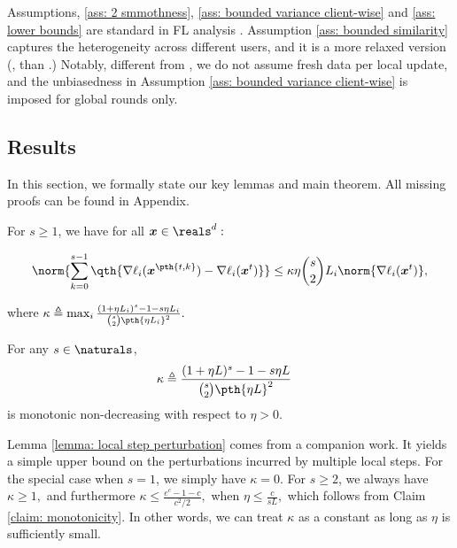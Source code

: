 \documentclass[letterpaper, 10 pt, conference]{ieeeconf}  %
\newcommand{\x}{{\bm x}}
\begin{document}
Assumptions, \ref{ass: 2 smmothness},  \ref{ass: bounded variance client-wise} and \ref{ass: lower bounds} are standard in FL analysis \cite{karimireddy2020scaffold,li2020federated,yuan2022}.
Assumption \ref{ass: bounded similarity} captures the heterogeneity across different users, and it is a more relaxed version (\eg, than \cite{li2020federated,yu2019parallel,wang2021cooperative}.)
Notably, different from \cite{gu2021fast}, we do not assume fresh data per local update, and the unbiasedness in Assumption \ref{ass: bounded variance client-wise} is imposed for global rounds only. 

\subsection{Results}
In this section, we formally state our key lemmas and main theorem. 
All missing proofs can be found in Appendix.
\begin{lemma}
\label{lemma: local step perturbation}
For $s\ge 1$, we have for all $\x\in\reals^d:$

\begin{small}
\[
\norm{\sum_{k=0}^{s-1}\qth{ \nabla \ell_i (\x^{\pth{t,k}}) - \nabla \ell_i (\x^t)}}
\le \kappa \eta \binom{s}{2} L_i \norm{\nabla \ell_{i}(\x^t)},
\]
\end{small}

where
$
\kappa \triangleq \max_{i}\frac{(1+\eta L_i)^s - 1- s \eta L_i}{\binom{s}{2}\pth{\eta L_i}^2}.
$
\end{lemma}
\begin{claim}
\label{claim: monotonicity}
For any $s\in \naturals$, 
    \begin{align*}
        \kappa &\triangleq \frac{(1+\eta L)^s - 1- s \eta L}{\binom{s}{2}\pth{\eta L}^2}
    \end{align*}
    is monotonic non-decreasing with respect to $\eta>0$. 
\end{claim}
\begin{remark}
Lemma \ref{lemma: local step perturbation} comes from a companion work.
It yields a simple upper bound on the perturbations incurred by multiple local steps.
For the special case when $s=1$, we simply have $\kappa=0$.
For $s\ge 2$, we always have $\kappa \ge 1,$
and furthermore $\kappa \le \frac{e^c-1-c}{c^2/2},$ when $\eta\le \frac{c}{sL},$
which follows from Claim \ref{claim: monotonicity}.
In other words, we can treat $\kappa$ as a constant as long as $\eta$ is sufficiently small. 
\end{remark}
\end{document}
